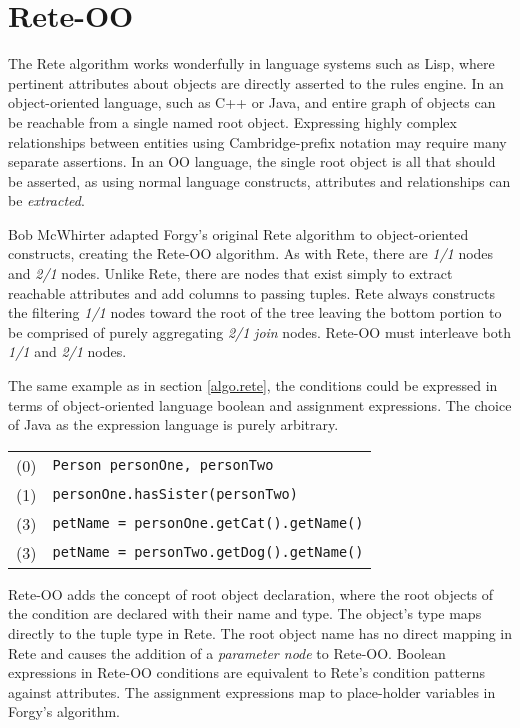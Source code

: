 \section{Rete-OO}

The Rete algorithm works wonderfully in language systems 
such as Lisp, where pertinent attributes about objects 
are directly asserted to the rules engine.  In an
object-oriented language, such as C++ or Java, and entire 
graph of objects can be reachable from a single named 
root object.  Expressing highly complex relationships between
entities using Cambridge-prefix notation may require many
separate assertions.  In an OO language, the single root
object is all that should be asserted, as using normal
language constructs, attributes and relationships can be
\emph{extracted}.

Bob McWhirter adapted Forgy's original Rete algorithm to 
object-oriented constructs, creating the Rete-OO algorithm.
As with Rete, there are \emph{1/1} nodes and \emph{2/1}
nodes.  Unlike Rete, there are nodes that exist simply 
to extract reachable attributes and add columns to passing
tuples. Rete always constructs the filtering \emph{1/1} nodes toward
the root of the tree leaving the bottom portion to be 
comprised of purely aggregating \emph{2/1} \emph{join} nodes.  
Rete-OO must interleave both \emph{1/1} and \emph{2/1} nodes.

The same example as in section \ref{algo.rete}, 
the conditions could be expressed in terms of object-oriented
language boolean and assignment expressions.  The choice
of Java as the expression language is purely arbitrary.

\medskip

\begin{tabular}{cl}
(0) & \texttt{Person personOne, personTwo} \\
(1) & \texttt{personOne.hasSister(personTwo)} \\
(3) & \texttt{petName = personOne.getCat().getName()} \\
(3) & \texttt{petName = personTwo.getDog().getName()} \\
\end{tabular}

\bigskip

Rete-OO adds the concept of root object declaration, where 
the root objects of the condition are declared with their
name and type.  The object's type maps directly to the
tuple type in Rete.  The root object name has no direct
mapping in Rete and causes the addition of a \emph{parameter node}
to Rete-OO.  Boolean expressions in Rete-OO conditions are
equivalent to Rete's condition patterns against attributes.
The assignment expressions map to place-holder variables in
Forgy's algorithm.

